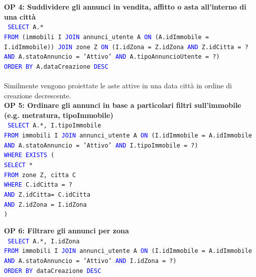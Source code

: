\documentclass[a4paper,12pt]{report}
\begin{document}
            \newpage
            \noindent
            \textbf{OP 4: Suddividere gli annunci in vendita, affitto o asta all’interno di una città} \\
            \texttt{
                \textcolor{blue}{SELECT} A.* \\
                \textcolor{blue}{FROM} (immobili I \textcolor{blue}{JOIN} annunci\_utente A \textcolor{blue}{ON} (A.idImmobile = I.idImmobile)) \textcolor{blue}{JOIN} zone Z \textcolor{blue}{ON} (I.idZona = Z.idZona \textcolor{blue}{AND} Z.idCitta = ? \textcolor{blue}{AND} A.statoAnnuncio = 'Attivo' \textcolor{blue}{AND} A.tipoAnnuncioUtente = ?) \\
                \textcolor{blue}{ORDER BY} A.dataCreazione  \textcolor{blue}{DESC} \\
            }
            \\
            Similmente vengono proiettate le aste attive in una data città in ordine di creazione decrescente.\\

            \noindent
            \textbf{OP 5: Ordinare gli annunci in base a particolari filtri sull'immobile (e.g. metratura, tipoImmobile)} \\
            \texttt{
                \textcolor{blue}{SELECT} A.*, I.tipoImmobile \\
                \textcolor{blue}{FROM} immobili I \textcolor{blue}{JOIN} annunci\_utente A \textcolor{blue}{ON} (I.idImmobile = A.idImmobile \textcolor{blue}{AND} A.statoAnnuncio = 'Attivo' \textcolor{blue}{AND} I.tipoImmobile = ?) \\
                \textcolor{blue}{WHERE} \textcolor{blue}{EXISTS} ( \\
                    \null\qquad \textcolor{blue}{SELECT} * \\
                    \null\qquad \textcolor{blue}{FROM} zone Z, citta C \\
                    \null\qquad \textcolor{blue}{WHERE} C.idCitta = ? \\
                    \null\qquad \textcolor{blue}{AND} Z.idCitta= C.idCitta \\
                    \null\qquad \textcolor{blue}{AND} Z.idZona = I.idZona\\
                    ) \\
            }

            \noindent
            \textbf{OP 6: Filtrare gli annunci per zona} \\
            \texttt{
                \textcolor{blue}{SELECT} A.*, I.idZona \\
                \textcolor{blue}{FROM} immobili I \textcolor{blue}{JOIN} annunci\_utente A \textcolor{blue}{ON} (I.idImmobile = A.idImmobile \\
                \textcolor{blue}{AND} A.statoAnnuncio = 'Attivo' \textcolor{blue}{AND} I.idZona = ?) \\
                \textcolor{blue}{ORDER BY} dataCreazione   \textcolor{blue}{DESC} \\
            }
\end{document}
